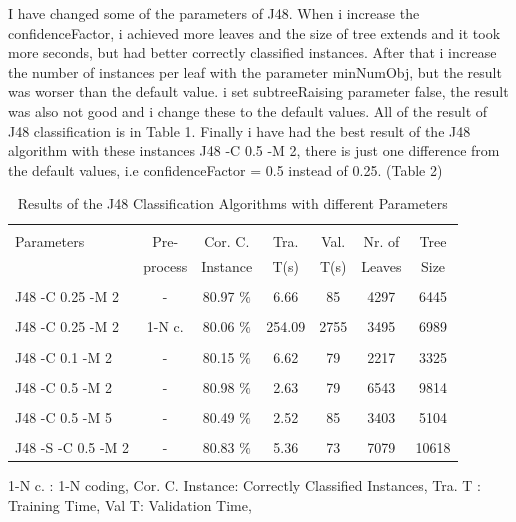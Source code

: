 \documentclass[a4paper]{article}
\begin{document}
I have changed some of the parameters of J48. When i increase the
confidenceFactor, i achieved more leaves and the size of tree extends and it
took more seconds, but had better correctly classified instances. After that i
increase the number of instances per leaf with the parameter minNumObj, but the
result was worser than the default value. i set subtreeRaising parameter false,
the result was also not good and i change these to the default values. All of
the result of J48 classification is in Table 1. Finally i have had the best
result of the J48 algorithm with these instances J48 -C 0.5 -M 2, there is just
one difference from the default values, i.e confidenceFactor = 0.5 instead of
0.25. (Table 2) 

\begin{table}
\begin{tabular}{|l| c | c | c | c |c |c |}

\hline & & & & & & \\
Parameters & Pre- & Cor. C.& Tra. & Val. & Nr. of  &  Tree  \\
 & process  & Instance & T(s) &  T(s) & Leaves & Size \\
\hline & & & & & & \\
J48 -C 0.25 -M 2 	 & - &			80.97  $\%$ & 6.66 & 85 & 4297  & 6445 \\ 
\hline & & & & & & \\
J48 -C 0.25 -M 2 	& 1-N c. &	80.06 $\%$ & 254.09 & 2755 & 3495  & 6989  \\ 
\hline & & & & & & \\
J48 -C 0.1 -M 2 	 & - &			80.15  $\%$ & 6.62 & 79 &  2217 & 3325\\ 
\hline & & & & & & \\
J48 -C 0.5 -M 2 	& - &			80.98 $\%$ & 2.63 & 79 &  6543 & 9814 \\ 
\hline & & & & & & \\
J48 -C 0.5 -M 5  	 & - &			80.49 $\%$ & 2.52 & 85 &  3403 & 5104 \\ 
\hline & & & & & & \\
J48 -S -C 0.5 -M 2 	& -&			 80.83 $\%$ & 5.36 &  73 & 7079 & 10618\\ 
\hline
\end{tabular}
\caption{Results of the J48 Classification Algorithms with different Parameters}
	1-N c. : 1-N coding,
	Cor. C. Instance:  Correctly Classified Instances,
	Tra. T : Training Time,
	Val T: Validation Time,
\end{table}
\end{document}
